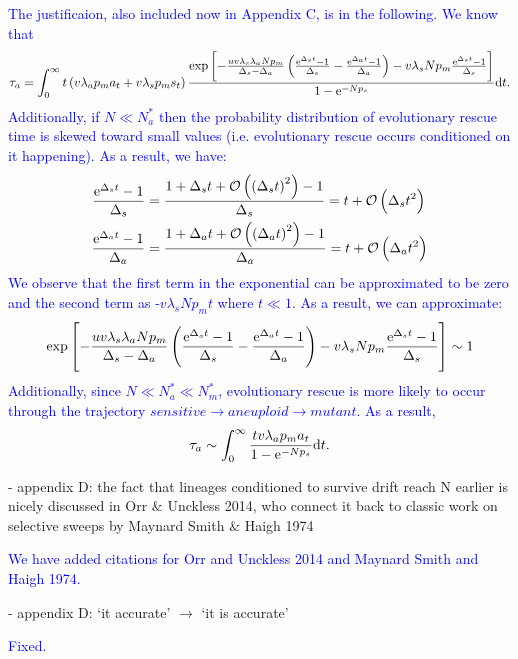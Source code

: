 \documentclass[12pt]{extarticle}
\renewcommand{\d}{{\rm d}}
\newcommand{\e}{{\rm e}}
\begin{document}
\textcolor{blue}{
The justificaion, also included now in Appendix C, is in the following. 
We know that
\begin{align*}
\tau_a=\int_0^\infty t\left(v\lambda_ap_ma_t+v\lambda_sp_ms_t\right)\frac{\exp\left[-\frac{uv\lambda_s\lambda_aNp_m}{\Delta_s-\Delta_a}\left(\frac{\e^{\Delta_s t}-1}{\Delta_s}-\frac{\e^{\Delta_a t}-1}{\Delta_a}\right)-v\lambda_sNp_m\frac{\e^{\Delta_s t}-1}{\Delta_s}\right] }{1-\e^{-Np_s}}\d t.
\end{align*}
Additionally, if $N\ll N_a^*$ then the probability distribution of evolutionary rescue time is skewed toward small values (i.e. evolutionary rescue occurs conditioned on it happening). As a result, we have: 
\begin{align*}
\frac{\e^{\Delta_s t}-1}{\Delta_s}&=\frac{1+\Delta_s t+\mathcal{O}\left(\left(\Delta_st\right)^2\right)-1}{\Delta_s}=t+\mathcal{O}\left(\Delta_st^2\right)\\
\frac{\e^{\Delta_a t}-1}{\Delta_a}&=\frac{1+\Delta_a t+\mathcal{O}\left(\left(\Delta_at\right)^2\right)-1}{\Delta_a}=t+\mathcal{O}\left(\Delta_at^2\right)
\end{align*}
We observe that the first term in the exponential can be approximated to be zero and the second term as -$v\lambda_sNp_mt$ where $t\ll1$. As a result, we can approximate:
\begin{equation*}
\exp\left[-\frac{uv\lambda_s\lambda_aNp_m}{\Delta_s-\Delta_a}\left(\frac{\e^{\Delta_s t}-1}{\Delta_s}-\frac{\e^{\Delta_a t}-1}{\Delta_a}\right)-v\lambda_sNp_m\frac{\e^{\Delta_s t}-1}{\Delta_s}\right] \sim 1
\end{equation*}
Additionally, since $N\ll N_a^*\ll N_m^*$, evolutionary rescue is more likely to occur through the trajectory $sensitive \rightarrow aneuploid \rightarrow mutant$. As a result,
\begin{equation*}
\tau_a\sim\int_0^\infty \frac{tv\lambda_ap_ma_t}{1-\e^{-Np_s}}\d t.
\end{equation*}
}

- appendix D: the fact that lineages conditioned to survive drift reach N earlier is nicely discussed in Orr $\&$ Unckless 2014, who connect it back to classic work on selective sweeps by Maynard Smith $\&$ Haigh 1974

\textcolor{blue}{We have added citations for Orr and Unckless 2014 and Maynard Smith and Haigh 1974. } %

- appendix D: `it accurate' $\rightarrow$ `it is accurate'

\textcolor{blue}{Fixed.} %
\end{document}
